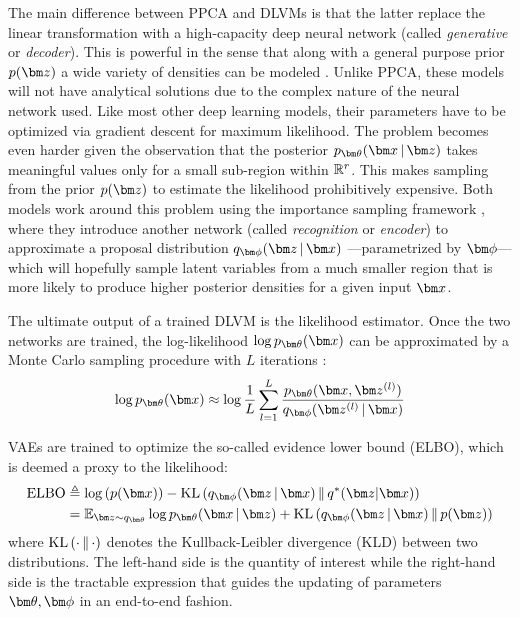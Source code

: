 \documentclass[journal, peerreview]{IEEEtran}
\begin{document}
The main difference between PPCA and DLVMs is that the latter replace the linear transformation with a high-capacity deep neural network (called \textit{generative} or \textit{decoder}).
This is powerful in the sense that along with a general purpose prior $\pz$ a wide variety of densities can be modeled \cite{kingma2019introduction}.
Unlike PPCA, these models will not have analytical solutions due to the complex nature of the neural network used.
Like most other deep learning models, their parameters have to be optimized via gradient descent for maximum likelihood.
The problem becomes even harder given the observation that the posterior $\decoding$ takes meaningful values only for a small sub-region within $\mathbb{R}^{r}$.
This makes sampling from the prior $\pz$ to estimate the likelihood prohibitively expensive.
Both models work around this problem using the importance sampling framework \cite[p. 532]{bishop2006pattern}, where they introduce another network (called \textit{recognition} or \textit{encoder}) to approximate a proposal distribution $\encoding$ ---parametrized by $\mbphi$--- which will hopefully sample latent variables from a much smaller region that is more likely to produce higher posterior densities for a given input $\mbx$. 

The ultimate output of a trained DLVM is the likelihood estimator.
Once the two networks are trained, the log-likelihood $\log \ptheta(\mbx)$ can be approximated by a Monte Carlo sampling procedure with $L$ iterations \cite[p. 30]{kingma2019introduction}:
\begin{equation}
\label{eqn:SummationLL}
\log \ptheta(\mbx) \approx \log \frac{1}{L} \sum_{l=1}^{L}\frac{\ptheta(\mbx,\mbz^{(l)})}{\qphizgivenx{\mbz^{(l)}}{\mbx}}    
\end{equation}

VAEs are trained to optimize the so-called evidence lower bound (ELBO), which is deemed a proxy to the likelihood:
\begin{equation}
\label{eqn:VAELoss}
\begin{split}
    \text{ELBO} &\triangleq \log\left( p(\mbx) \right) - \KL{\encoding}{q^{*}(\mbz|\mbx)} \\ 
	&= \E_{\mbz \sim q_{\mbtheta}} \log \decoding + \KL{\encoding}{p(\mbz)}
\end{split}
\end{equation}
where $\textrm{KL}\left(\cdot\,\|\,\cdot\right)$ denotes the Kullback-Leibler divergence (KLD) between two distributions. 
The left-hand side is the quantity of interest while the right-hand side is the tractable expression that guides the updating of parameters $\mbtheta, \mbphi$ in an end-to-end fashion.
\end{document}
